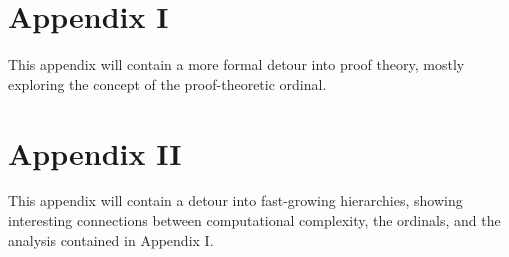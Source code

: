 \documentclass[10pt]{article}
\begin{document}
\section{Appendix I}
This appendix will contain a more formal detour into proof theory, mostly exploring the concept of the proof-theoretic ordinal.

\section{Appendix II}
This appendix will contain a detour into fast-growing hierarchies, showing interesting connections between computational complexity, the ordinals, and the analysis contained in Appendix I.
\end{document}
